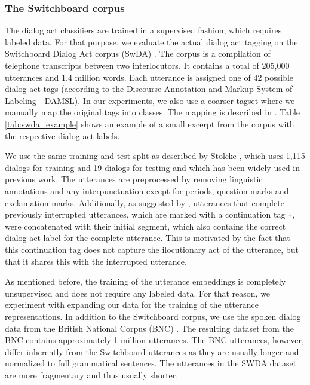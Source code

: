 \subsubsection*{The Switchboard corpus}

The dialog act classifiers are trained in a supervised fashion, which requires labeled data.
For that purpose, we evaluate the actual dialog act tagging on the Switchboard Dialog Act corpus (SwDA) .
The corpus is a compilation of telephone transcripts between two interlocutors.
It contains a total of 205,000 utterances and 1.4 million words.
Each utterance is assigned one of 42 possible dialog act tags (according to the Discourse Annotation and Markup System of Labeling - DAMSL).
In our experiments, we also use a coarser tagset where we manually map the original tags into  classes. The mapping is described in  .
Table \ref{tab:swda_example} shows an example of a small excerpt from the corpus with the respective dialog act labels. 

We use the same training and test split as described by Stolcke , which uses 1,115 dialogs for training and 19 dialogs for testing and which has been widely used in previous work. 
The utterances are preprocessed by removing linguistic annotations and any interpunctuation except for periods, question marks and exclamation marks.
Additionally, as suggested by , utterances that complete previously interrupted utterances, which are marked with a continuation tag \texttt{+}, were concatenated with their initial segment, which also contains the correct dialog act label for the complete utterance. This is motivated by the fact that this continuation tag does not capture the ilocutionary act of the utterance, but that it shares this with the interrupted utterance.

As mentioned before, the training of the utterance embeddings is completely unsupervised and does not require any labeled data.
For that reason, we experiment with expanding our data for the training of the utterance representations.
In addition to the Switchboard corpus, we use the spoken dialog data from the British National Corpus (BNC) .
The resulting dataset from the BNC contains approximately 1 million utterances. 
The BNC utterances, however, differ inherently from the Switchboard utterances as they are usually longer and normalized to full grammatical sentences.
The utterances in the SWDA dataset are more fragmentary and thus usually shorter.


